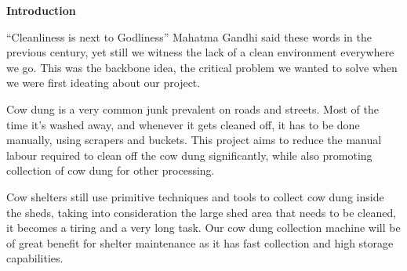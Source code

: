 \begin{center}
\begin{huge}
\bfseries{Introduction}
\end{huge}
\end{center}
\noindent “Cleanliness is next to Godliness”
Mahatma Gandhi said these words in the previous century, yet still we witness the lack of a clean environment everywhere we go. This was the backbone idea, the critical problem we wanted to solve when we were first ideating about our project. 

Cow dung is a very common junk prevalent on roads and streets. Most of the time it’s washed away, and whenever it gets cleaned off, it has to be done manually, using scrapers and buckets. This project aims to reduce the manual labour required to clean off the cow dung significantly, while also promoting collection of cow dung for other processing.

Cow shelters still use primitive techniques and tools to collect cow dung inside the sheds, taking into consideration the large shed area that needs to be cleaned, it becomes a tiring and a very long task. Our cow dung collection machine will be of great benefit for shelter maintenance as it has fast collection and high storage capabilities.

\pagebreak
